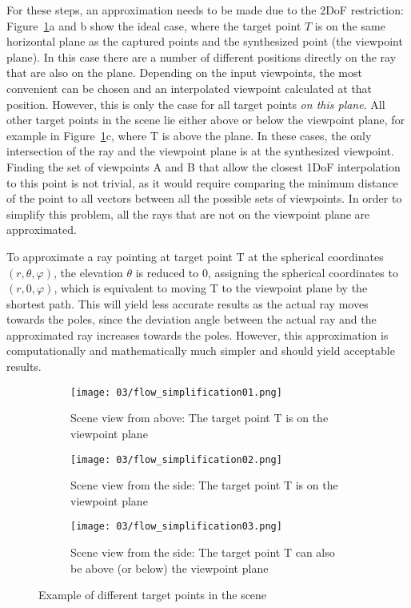 For these steps, an approximation needs to be made due to the 2DoF restriction: Figure~\ref{fig:flow_simplification-mot}a and b show the ideal case, where the target point $T$ is on the same horizontal plane as the captured points and the synthesized point (the viewpoint plane). In this case there are a number of different positions directly on the ray that are also on the plane. Depending on the input viewpoints, the most convenient can be chosen and an interpolated viewpoint calculated at that position. However, this is only the case for all target points \emph{on this plane}. All other target points in the scene lie either above or below the viewpoint plane, for example in Figure~\ref{fig:flow_simplification-mot}c, where T is above the plane. In these cases, the only intersection of the ray and the viewpoint plane is at the synthesized viewpoint. Finding the set of viewpoints A and B that allow the closest 1DoF interpolation to this point is not trivial, as it would require comparing the minimum distance of the point to all vectors between all the possible sets of viewpoints. In order to simplify this problem, all the rays that are not on the viewpoint plane are approximated.

To approximate a ray pointing at target point T at the spherical coordinates $(r, \theta, \varphi)$, the elevation $\theta$ is reduced to 0, assigning the spherical coordinates to $(r, 0, \varphi)$, which is equivalent to moving T to the viewpoint plane by the shortest path. This will yield less accurate results as the actual ray moves towards the poles, since the deviation angle between the actual ray and the approximated ray increases towards the poles. However, this approximation is computationally and mathematically much simpler and should yield acceptable results.

\begin{figure}
\centering
    \hfill
    \begin{subfigure}[t]{0.3\textwidth}
            \centering
            \texttt{[image: 03/flow\_simplification01.png]}
            \caption{Scene view from above: The target point T is on the viewpoint plane}
    \end{subfigure}%
    \hfill
    \begin{subfigure}[t]{0.3\textwidth}
            \centering
            \texttt{[image: 03/flow\_simplification02.png]}
            \caption{Scene view from the side: The target point T is on the viewpoint plane}
    \end{subfigure}
    \hfill
    \begin{subfigure}[t]{0.3\textwidth}
            \centering
            \texttt{[image: 03/flow\_simplification03.png]}
            \caption{Scene view from the side: The target point T can also be above (or below) the viewpoint plane}
    \end{subfigure}%
    \hfill
    \hfill
  \caption{Example of different target points in the scene} \label{fig:flow_simplification-mot}
\end{figure}

